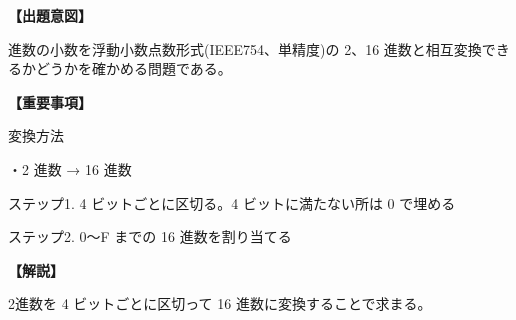 \noindent \textbf{【出題意図】}

 進数の小数を浮動小数点数形式(IEEE754、単精度)の 2、16 進数と相互変換できるかどうかを確かめる問題である。

\vspace{1em}
\noindent \textbf{【重要事項】}

\noindent 変換方法

\medskip
\noindent ・2 進数 → 16 進数

\noindent ステップ1.  4 ビットごとに区切る。4 ビットに満たない所は 0 で埋める

\noindent ステップ2.  0〜F までの 16 進数を割り当てる


\vspace{1em}
\noindent \textbf{【解説】}

\noindent 2進数を 4 ビットごとに区切って 16 進数に変換することで求まる。
